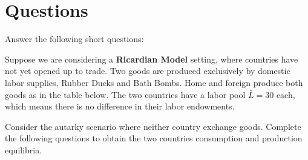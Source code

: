 \documentclass[12pt]{exam}
\begin{document}
\section*{Questions}
\begin{questions}

\question
Answer the following short questions:


\newpage 

\question
Suppose we are considering a \textbf{Ricardian Model} setting, where countries have not yet opened up to trade. 
Two goods are produced exclusively by domestic labor supplies, Rubber Ducks and Bath Bombs. 
Home and foreign produce both goods as in the table below. 
The two countries have a labor pool $\bar{L} = 30$ each, which means there is no difference in their labor endowments. 



Consider the autarky scenario where neither country exchange goods. 
Complete the following questions to obtain the two countries consumption and production equilibria. 

\end{questions}
\end{document}
